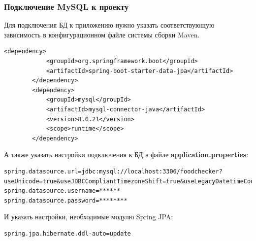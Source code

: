 \documentclass[a4paper]{article}
\begin{document}
\subsubsection{Подключение MySQL к проекту}

Для подключения БД к приложению нужно указать соответствующую зависимость в конфигурационном файле системы сборки Maven.
\hfill\break
{}         
\begin{lstlisting}[label=lis4,caption=Подключение MySQL в Maven>>] 
		<dependency>
            <groupId>org.springframework.boot</groupId>
            <artifactId>spring-boot-starter-data-jpa</artifactId>
        </dependency>
        <dependency>
            <groupId>mysql</groupId>
            <artifactId>mysql-connector-java</artifactId>
            <version>8.0.21</version>
            <scope>runtime</scope>
        </dependency>
\end{lstlisting}

А также указать настройки подключения к БД в файле \textbf{application.properties}:
\hfill\break
{}         
\begin{lstlisting}[label=lis5,caption=Настройки MySQL в application.properties>>] 
spring.datasource.url=jdbc:mysql://localhost:3306/foodchecker?useUnicode=true&useJDBCCompliantTimezoneShift=true&useLegacyDatetimeCode=false&serverTimezone=UTC
spring.datasource.username=******
spring.datasource.password=********
\end{lstlisting}

И указать настройки, необходимые модулю Spring JPA:
\hfill\break
{}         
\begin{lstlisting}[label=lis6,caption=Настройки Spring JPA в application.properties>>] 
spring.jpa.hibernate.ddl-auto=update
\end{lstlisting}
\end{document}
